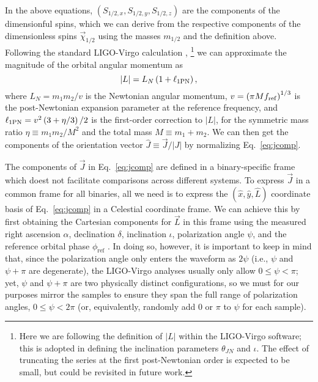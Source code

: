\documentclass[twocolumn,twocolappendix,linenumbers]{aastex631}
\begin{document}
In the above equations, $(S_{1/2,x},S_{1/2,y},S_{1/2,z})$ are the components of the dimensionful spins, which we can derive from the respective components of the dimensionless spins $\vec{\chi}_{1/2}$ using the masses $m_{1/2}$ and the definition above. 
Following the standard LIGO-Virgo calculation \citep{LALSuite:spins},%
\footnote{Here we are following the definition of $|L|$ within the LIGO-Virgo software; this is adopted in defining the inclination parameters $\theta_{JN}$ and $\iota$. The effect of truncating the series at the first post-Newtonian order is expected to be small, but could be revisited in future work.}
we can approximate the magnitude of the orbital angular momentum as \citep{Kidder:1995zr,Bohe:2012mr}
\begin{equation}
|L| = L_N \left(1 + \ell_{\rm 1PN}\right),
\end{equation}
where $L_N = m_1 m_2 / v$ is the Newtonian angular momentum, $v = \left( \pi M f_{\rm ref} \right)^{1/3}$ is the post-Newtonian expansion parameter at the reference frequency, and $\ell_{\rm 1PN} = v^2 \left( 3 + \eta /3 \right)/2$ is the first-order correction to $|L|$, for the symmetric mass ratio $\eta \equiv m_1 m_2/M^2$ and the total mass $M \equiv m_1 + m_2$.
We can then get the components of the orientation vector $\hat{J} \equiv \vec{J} /|J|$ by normalizing Eq.~\eqref{eq:jcomp}.

The components of $\vec{J}$ in Eq.~\eqref{eq:jcomp} are defined in a binary-specific frame which doest not facilitate comparisons across different systems.
To express $\vec{J}$ in a common frame for all binaries, all we need is to express the $(\hat{x}, \hat{y}, \hat{L})$ coordinate basis of Eq.~\eqref{eq:jcomp} in a Celestial coordinate frame.
We can achieve this by first obtaining the Cartesian components for $\vec{L}$ in this frame using the measured right ascension $\alpha$, declination $\delta$, inclination $\iota$, polarization angle $\psi$, and the reference orbital phase $\phi_\mathrm{ref}$ \citep[see, e.g., Figs.~6 and 8][]{Isi:2022mbx}.
In doing so, however, it is important to keep in mind that, since the polarization angle only enters the waveform as $2\psi$ (i.e., $\psi$ and $\psi + \pi$ are degenerate), the LIGO-Virgo analyses usually only allow $0 \leq \psi < \pi$; yet, $\psi$ and $\psi + \pi$ are two physically distinct configurations, so we must for our purposes mirror the samples to ensure they span the full range of polarization angles, $0 \leq \psi < 2\pi$ (or, equivalently, randomly add $0$ or $\pi$ to $\psi$ for each sample).
\end{document}
